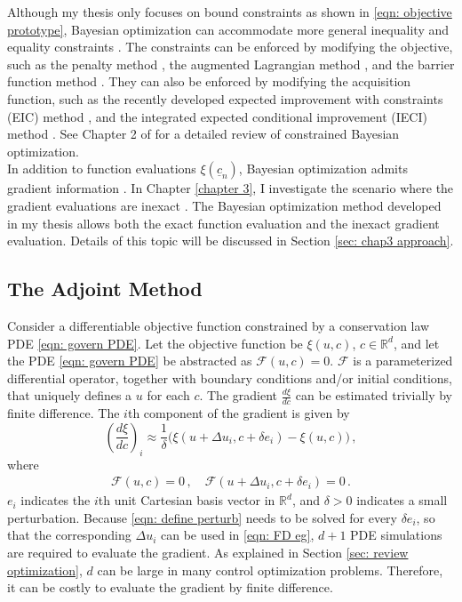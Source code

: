 Although my thesis only focuses on bound constraints as shown in \eqref{eqn: objective prototype}, 
Bayesian optimization can accommodate more general inequality and equality 
constraints \cite{PhD review constraint}. The constraints can be enforced by modifying the objective, such as
the penalty method \cite{penalty method}, the augmented Lagrangian method
\cite{augmented lagrangian method}, and the barrier function method \cite{barrier method}.
They can also be enforced by modifying the acquisition function, such as the
recently developed expected improvement with constraints (EIC) method \cite{EIC},
and the integrated expected conditional improvement (IECI) method \cite{IECI}.
See Chapter 2 of \cite{PhD review constraint} 
for a detailed review of constrained Bayesian optimization.\\

In addition to function evaluations $\xi(\underline{c}_n)$, Bayesian optimization
admits gradient information \cite{derivative RKHS, grad coKriging}. In Chapter \ref{chapter 3},
I investigate the scenario where the gradient
evaluations are inexact \cite{KennedyOhagan2}.
The Bayesian optimization method developed in my thesis 
allows both the exact function evaluation and the inexact gradient evaluation.
Details of this topic will be discussed in Section
\ref{sec: chap3 approach}.

\subsection{The Adjoint Method}
Consider a differentiable objective function constrained by a conservation law PDE 
\eqref{eqn: govern PDE}.
Let the objective function be $\xi(u,c)$, $c\in \mathbb{R}^d$, 
and let the PDE \eqref{eqn: govern PDE} be abstracted
as $\mathcal{F}(u,c) = 0$. 
$\mathcal{F}$ is a parameterized differential operator, 
together with boundary conditions and/or initial conditions, that uniquely defines a $u$ for each $c$.
The gradient $\frac{d\xi}{dc}$ can be estimated trivially by finite difference. The
$i$th component of the gradient is given by
\begin{equation}
    \left(\frac{d\xi}{dc}\right)_i \approx \frac{1}{\delta} \big( 
    \xi(u+ \Delta u_i, c+\delta e_i) - \xi(u, c) \big)\,,
    \label{eqn: FD eg}
\end{equation}
where
\begin{equation}\begin{split}
    \mathcal{F}(u,c)=0\,, \quad \mathcal{F}(u+\Delta u_i, c+ \delta e_i) = 0\,.
\end{split}
\label{eqn: define perturb}
\end{equation}
$e_i$ indicates the $i$th unit Cartesian basis vector in $\mathbb{R}^d$, and $\delta>0$ indicates
a small perturbation. 
Because \eqref{eqn: define perturb} needs to be solved for every $\delta e_i$, 
so that the corresponding $\Delta u_i$ can be used in \eqref{eqn: FD eg},
$d+1$ PDE simulations are required to evaluate the gradient.
As explained in Section \ref{sec: review optimization}, $d$ can be large in many
control optimization problems. Therefore, it can be costly to evaluate the gradient 
by finite difference.\\

